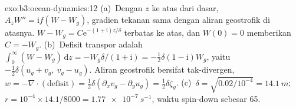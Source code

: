 \begin{solution}{exo:b3:ocean-dynamics:12}
(a)~Dengan $z$ ke atas dari dasar, $A_zW'' = \mathrm if(W - W_g)$, gradien
tekanan sama dengan aliran geostrofik di atasnya. $W - W_g =
C\mathrm e^{-(1+\mathrm i)z/\delta}$ terbatas ke atas, dan $W(0) = 0$ memberikan
$C = -W_g$. (b)~Defisit transpor adalah $\int_0^\infty(W - W_g)\,\mathrm dz
= -W_g\delta/(1+\mathrm i) = -\tfrac12\delta(1 - \mathrm i)W_g$, yaitu
$-\tfrac12\delta(u_g + v_g,\ v_g - u_g)$. Aliran geostrofik bersifat
tak-divergen, $w = -\nabla\cdot(\text{defisit}) = \tfrac12\delta(\partial_x
v_g - \partial_y u_g) = \tfrac12\delta\zeta_g$. (c)~$\delta =
\sqrt{0.02/10^{-4}} = \qty{14.1}{m}$; $r = 10^{-4}\times14.1/8000 =
\qty{1.77e-7}{s^{-1}}$, waktu spin-down sebesar \num{65}.
\end{solution}

